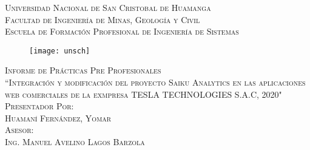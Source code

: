 \newcommand{\mydate}{\formatdate{21}{11}{2020}}

\begin{titlepage}
	\begin{center}
		\textsc{ 
		\Large Universidad Nacional de San Cristobal de Huamanga\\
		\vspace{5mm}
			Facultad de Ingenier\'{i}a de Minas, Geolog\'{i}a y Civil\\
		\vspace{5mm}
		Escuela de Formaci\'{o}n Profesional de Ingenier\'{i}a de Sistemas\\}
	
			\begin{figure}[h]
				\centering
				\texttt{[image: unsch]}
			\end{figure}
		
		\textsc{ 
			\large Informe de Prácticas Pre Profesionales\\
			\vspace{5mm}
				``Integración y modificación del proyecto Saiku Analytics en las aplicaciones web comerciales de la exmpresa TESLA TECHNOLOGIES S.A.C, 2020"\\
			\vspace{1cm}
			Presentador Por:\\
			Huamaní Fernández, Yomar\\	
			\vspace{5mm}
			Asesor:\\
			Ing. Manuel Avelino Lagos Barzola\\
			\vspace{5mm}
			\mydate
		}
	\end{center}
\end{titlepage}